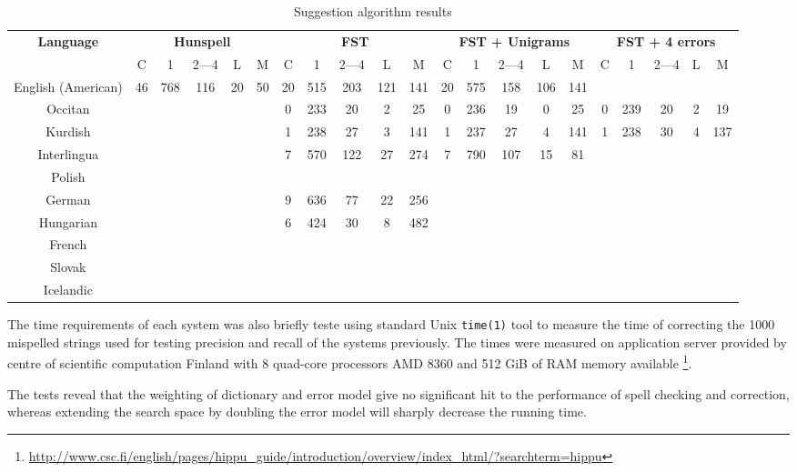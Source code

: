 \documentclass[postprint]{flammie}
\begin{document}
\begin{table}[tbp]
  \caption{Suggestion algorithm results}
  \label{table:error-analysis}
  \centering
  \begin{scriptsize}
  \begin{tabular}{c ccccc ccccc ccccc ccccc}
    \hline
    \textbf{Language} & \multicolumn{5}{c}{\bf Hunspell} & \multicolumn{5}{c}{\bf FST} & \multicolumn{5}{c}{\bf FST + Unigrams} & \multicolumn{5}{c}{\bf FST + 4 errors}  \\
    & C & 1 & 2---4 & L & M & C & 1 & 2---4 & L & M & C & 1 & 2---4 & L & M & C & 1 & 2---4 & L & M  \\
    \hline
    \hline
    English (American) & 46 & 768 & 116 & 20 & 50 & 20 & 515 & 203 & 121 & 141 & 20 & 575 & 158 & 106 & 141 &&&& \\
    Occitan & &&&& & 0 & 233 & 20 & 2 & 25 & 0 & 236 & 19 & 0 & 25 & 0 & 239 & 20 & 2 & 19 \\
    Kurdish & &&&& & 1 & 238 & 27 & 3 & 141 & 1 & 237 & 27 & 4 & 141 & 1 & 238 & 30 & 4 & 137 \\
    Interlingua & &&&& & 7 & 570 & 122 & 27 & 274 & 7 & 790 & 107 & 15 & 81 & \\
    Polish & &&&& &&&& &&&& \\
    German & &&&& & 9 & 636 & 77 & 22 & 256 &&& &&&& \\
    Hungarian & &&&& & 6 & 424 & 30 & 8 & 482 &&& &&&& \\
    French & \\
    Slovak & \\
    Icelandic & \\
    \hline
  \end{tabular}
  \end{scriptsize}
\end{table}

The time requirements of each system was also briefly teste using standard
Unix \verb|time(1)| tool to measure the time of correcting the 1000
mispelled strings used for testing precision and recall of the systems
previously. The times were measured on application server provided by
centre of scientific computation Finland with 8 quad-core processors 
AMD 8360 and 512 GiB of RAM memory available 
\footnote{\url{http://www.csc.fi/english/pages/hippu\_guide/introduction/overview/index\_html/?searchterm=hippu}}.

The tests reveal that the weighting of dictionary and error model give no
significant hit to the performance of spell checking and correction, whereas
extending the search space by doubling the error model will sharply decrease the
running time.
\end{document}
